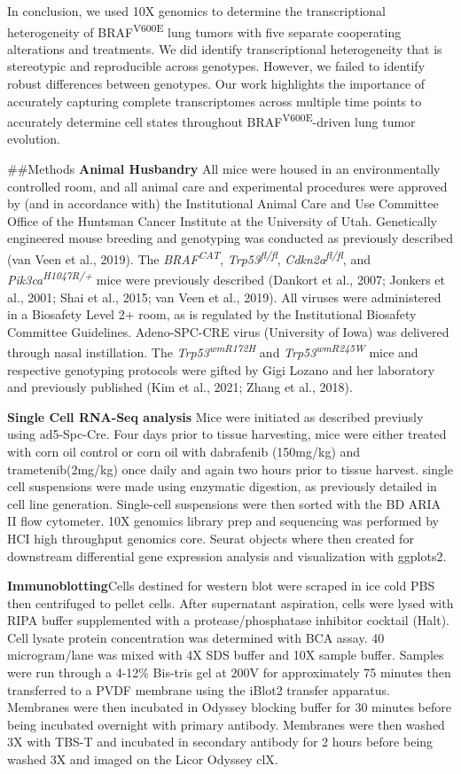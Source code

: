 In conclusion, we used 10X genomics to determine the transcriptional heterogeneity of BRAF\textsuperscript{V600E} lung tumors with five separate cooperating alterations and treatments. We did identify transcriptional heterogeneity that is stereotypic and reproducible across genotypes. However, we failed to identify robust differences between genotypes. Our work highlights the importance of accurately capturing complete transcriptomes across multiple time points to accurately determine cell states throughout BRAF\textsuperscript{V600E}-driven lung tumor evolution.

\#\#Methods
\textbf{Animal Husbandry} All mice were housed in an environmentally controlled room, and all animal care and experimental procedures were approved by (and in accordance with) the Institutional Animal Care and Use Committee Office of the Huntsman Cancer Institute at the University of Utah. Genetically engineered mouse breeding and genotyping was conducted as previously described (van Veen et al., 2019). The \emph{BRAF\textsuperscript{CAT}}, \emph{Trp53\textsuperscript{fl/fl}}, \emph{Cdkn2a\textsuperscript{fl/fl}}, and \emph{Pik3ca\textsuperscript{H1047R/+}} mice were previously described (Dankort et al., 2007; Jonkers et al., 2001; Shai et al., 2015; van Veen et al., 2019). All viruses were administered in a Biosafety Level 2+ room, as is regulated by the Institutional Biosafety Committee Guidelines. Adeno-SPC-CRE virus (University of Iowa) was delivered through nasal instillation. The \emph{Trp53\textsuperscript{wmR172H}} and \emph{Trp53\textsuperscript{wmR245W}} mice and respective genotyping protocols were gifted by Gigi Lozano and her laboratory and previously published (Kim et al., 2021; Zhang et al., 2018).

\textbf{Single Cell RNA-Seq analysis} Mice were initiated as described previusly using ad5-Spc-Cre. Four days prior to tissue harvesting, mice were either treated with corn oil control or corn oil with dabrafenib (150mg/kg) and trametenib(2mg/kg) once daily and again two hours prior to tissue harvest. single cell suspensions were made using enzymatic digestion, as previously detailed in cell line generation. Single-cell suspensions were then sorted with the BD ARIA II flow cytometer. 10X genomics library prep and sequencing was performed by HCI high throughput genomics core. Seurat objects where then created for downstream differential gene expression analysis and visualization with ggplots2.

\textbf{Immunoblotting}Cells destined for western blot were scraped in ice cold PBS then centrifuged to pellet cells. After supernatant aspiration, cells were lysed with RIPA buffer supplemented with a protease/phosphatase inhibitor cocktail (Halt). Cell lysate protein concentration was determined with BCA assay. 40 microgram/lane was mixed with 4X SDS buffer and 10X sample buffer. Samples were run through a 4-12\% Bis-tris gel at 200V for approximately 75 minutes then transferred to a PVDF membrane using the iBlot2 transfer apparatus. Membranes were then incubated in Odyssey blocking buffer for 30 minutes before being incubated overnight with primary antibody. Membranes were then washed 3X with TBS-T and incubated in secondary antibody for 2 hours before being washed 3X and imaged on the Licor Odyssey clX.

